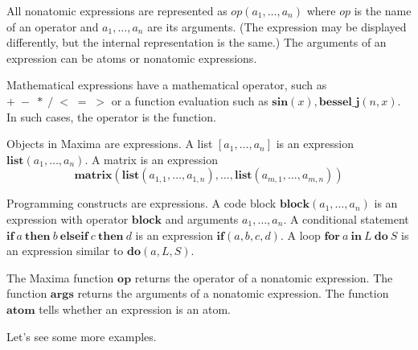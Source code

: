 \documentclass[12pt]{article}
\begin{document}
All nonatomic expressions are represented as $\mathit{op}(a_1, \ldots, a_n)$
where $\mathit{op}$ is the name of an operator
and $a_1, \ldots, a_n$ are its arguments.
(The expression may be displayed differently,
but the internal representation is the same.)
The arguments of an expression can be atoms or nonatomic expressions.

Mathematical expressions have a mathematical operator,
such as $+ \; - \; * \; / \; < \; = \; >$
or a function evaluation such as $\mathbf{sin}(x), \mathbf{bessel\_j}(n, x)$.
In such cases, the operator is the function.

Objects in Maxima are expressions.
A list $[a_1, \ldots, a_n]$ is an expression $\mathbf{list}(a_1, \ldots, a_n)$.
A matrix is an expression
\[
\mathbf{matrix}(\mathbf{list}(a_{1,1}, \ldots, a_{1,n}), \ldots, \mathbf{list}(a_{m,1}, \ldots, a_{m,n}))
\]

Programming constructs are expressions.
A code block $\mathbf{block} (a_1, \ldots, a_n)$ is an expression with operator $\mathbf{block}$
and arguments $a_1, \ldots, a_n$.
A conditional statement $\mathbf{if\ } a \mathbf{\ then\ } b \mathbf{\ elseif\ } c \mathbf{\ then\ } d$
is an expression $\mathbf{if}(a, b, c, d)$.
A loop $\mathbf{for\ } a \mathbf{\ in\ } L \mathbf{\ do\ } S$ is an expression similar to $\mathbf{do}(a, L, S)$.

The Maxima function $\mathbf{op}$ returns the operator of a nonatomic expression.
The function $\mathbf{args}$ returns the arguments of a nonatomic expression.
The function $\mathbf{atom}$ tells whether an expression is an atom.

Let's see some more examples.
\end{document}
